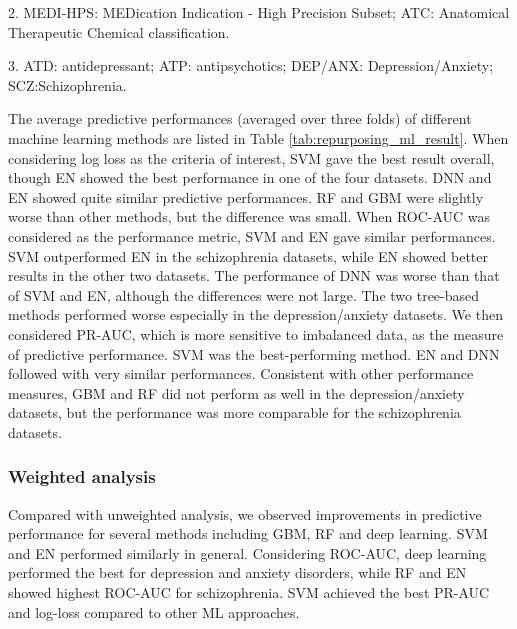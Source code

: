 \begin{table}[htbp]
\begin{threeparttable}
\begin{tablenotes}
            \item 2. MEDI-HPS: MEDication Indication - High Precision Subset; ATC: Anatomical Therapeutic Chemical classification. 
            \item 3. ATD: antidepressant; ATP: antipsychotics; DEP/ANX: Depression/Anxiety; SCZ:Schizophrenia. 
          \end{tablenotes}
        \end{threeparttable}  
        \label{tab:repurposing_ml_result}%
      \end{table}%

      The average predictive performances (averaged over three folds) of different machine learning methods are listed in Table \ref{tab:repurposing_ml_result}. When considering log loss as the criteria of interest, SVM gave the best result overall, though EN showed the best performance in one of the four datasets. DNN and EN showed quite similar predictive performances. RF and GBM were slightly worse than other methods, but the difference was small. 
      When ROC-AUC was considered as the performance metric, SVM and EN gave similar performances. SVM outperformed EN in the schizophrenia datasets, while EN showed better results in the other two datasets. The performance of DNN was worse than that of SVM and EN, although the differences were not large. The two tree-based methods performed worse especially in the depression/anxiety datasets.
      We then considered PR-AUC, which is more sensitive to imbalanced data, as the measure of predictive performance. SVM was the best-performing method. EN and DNN followed with very similar performances. Consistent with other performance measures, GBM and RF did not perform as well in the depression/anxiety datasets, but the performance was more comparable for the schizophrenia datasets.

    \subsubsection{Weighted analysis} 
      Compared with unweighted analysis, we observed improvements in predictive performance for several methods including GBM, RF and deep learning. SVM and EN performed similarly in general. Considering ROC-AUC, deep learning performed the best for depression and anxiety disorders, while RF and EN showed highest ROC-AUC for schizophrenia. SVM achieved the best PR-AUC and log-loss compared to other ML approaches.

